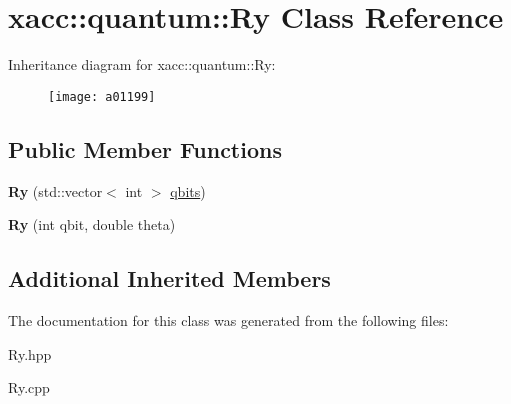 \hypertarget{a01199}{}\section{xacc\+:\+:quantum\+:\+:Ry Class Reference}
\label{a01199}
Inheritance diagram for xacc\+:\+:quantum\+:\+:Ry\+:\begin{figure}[H]
\begin{center}
\leavevmode
\texttt{[image: a01199]}
\end{center}
\end{figure}
\subsection*{Public Member Functions}
\begin{DoxyCompactItemize}
\item 
\mbox{\label{a01199_a542e1c0576a8e784f6cece4c77598486}} 
{\bfseries Ry} (std\+::vector$<$ int $>$ \hyperlink{a01159_a2a56be6c2519ea65df4d06f4abae1393}{qbits})
\item 
\mbox{\label{a01199_a1cb81fe622168ba8d79fa2a78b5b0006}} 
{\bfseries Ry} (int qbit, double theta)
\end{DoxyCompactItemize}
\subsection*{Additional Inherited Members}


The documentation for this class was generated from the following files\+:\begin{DoxyCompactItemize}
\item 
Ry.\+hpp\item 
Ry.\+cpp\end{DoxyCompactItemize}
